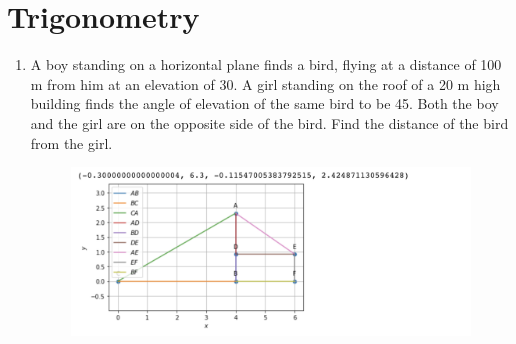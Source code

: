 \documentclass[journal,12pt,twocolumn]{IEEEtran}
\renewcommand\thesection{\arabic{section}}
\begin{document}
\section{Trigonometry}
\renewcommand{\theequation}{\theenumi}
\begin{enumerate}[label=\thesection.\arabic*.,ref=\thesection.\theenumi]
\item A boy standing on a horizontal plane finds a bird, flying at a distance of 100 m from him at an elevation of 30\textdegree . A girl standing on the roof of a 20 m high building finds the angle of elevation of the same bird to be 45\textdegree. Both the boy and the girl are on the opposite side of the bird. Find the distance of the bird from the girl.\\
\begin{table}[ht]
 \centering
 \caption{}
 \end{table} 

 \begin{figure}
	  \centering 
	  \includegraphics[width=\columnwidth]{4.1}
	  \caption{}
	  \label{fig:geometry-3.9.pdf}
 \end{figure}


\end{enumerate}
\end{document}
